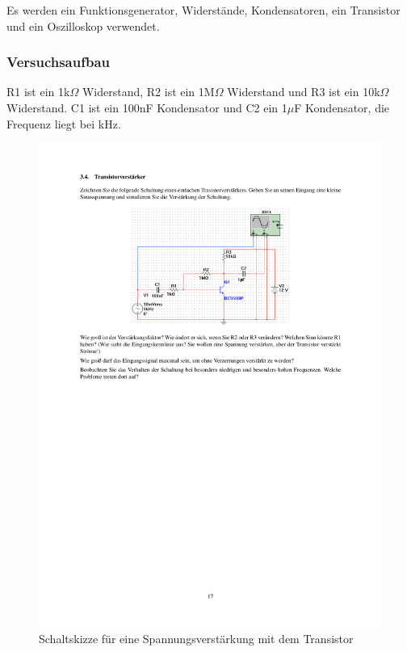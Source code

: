 \documentclass[12pt,a4paper]{article}
\begin{document}
Es werden ein Funktionsgenerator, Widerstände, Kondensatoren, ein Transistor und ein Oszilloskop verwendet.

\subsubsection{Versuchsaufbau}

R1 ist ein 1k$\Omega$ Widerstand, R2 ist ein 1M$\Omega$ Widerstand und R3 ist ein 10k$\Omega$ Widerstand. C1 ist ein 100nF Kondensator und C2 ein 1$\mu$F Kondensator, die Frequenz liegt bei \unit[30] {kHz}.


\begin{figure}[H] 
  \centering
    \includegraphics[trim = 10mm 180mm 10mm 40mm, clip, scale = 1]{ep5_14[Page17].pdf}
  	\caption[Schaltskizze für eine Spannungsverstärkung mit dem Transistor]{Schaltskizze für eine Spannungsverstärkung mit dem Transistor\footnotemark}
  \label{fig:3.4}
\end{figure}
\end{document}
